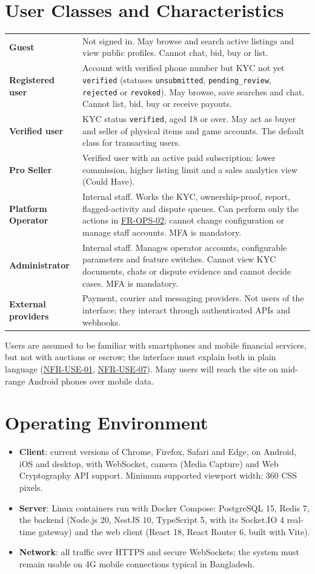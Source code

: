 \documentclass[11pt,a4paper]{report}
\makeatletter
\newcommand{\rr}[1]{\hyperlink{#1}{#1}}
\newenvironment{deftable}{\small\begin{longtable}{@{}>{\raggedright\arraybackslash}p{3.6cm}>{\raggedright\arraybackslash}p{11.3cm}@{}}}{\end{longtable}}
\makeatother
\begin{document}
\section{User Classes and Characteristics}
\label{sec:classes}
\begin{deftable}
\textbf{Guest} & Not signed in. May browse and search active listings and view public profiles. Cannot chat, bid, buy or list. \\
\textbf{Registered user} & Account with verified phone number but KYC not yet \texttt{verified} (statuses \texttt{unsubmitted}, \texttt{pending\_review}, \texttt{rejected} or \texttt{revoked}). May browse, save searches and chat. Cannot list, bid, buy or receive payouts. \\
\textbf{Verified user} & KYC status \texttt{verified}, aged 18 or over. May act as buyer and seller of physical items and game accounts. The default class for transacting users. \\
\textbf{Pro Seller} & Verified user with an active paid subscription: lower commission, higher listing limit and a sales analytics view (Could Have). \\
\textbf{Platform Operator} & Internal staff. Works the KYC, ownership-proof, report, flagged-activity and dispute queues. Can perform only the actions in \rr{FR-OPS-02}; cannot change configuration or manage staff accounts. MFA is mandatory. \\
\textbf{Administrator} & Internal staff. Manages operator accounts, configurable parameters and feature switches. Cannot view KYC documents, chats or dispute evidence and cannot decide cases. MFA is mandatory. \\
\textbf{External providers} & Payment, courier and messaging providers. Not users of the interface; they interact through authenticated APIs and webhooks. \\
\end{deftable}
Users are assumed to be familiar with smartphones and mobile financial services, but not with auctions or escrow; the interface must explain both in plain language (\rr{NFR-USE-01}, \rr{NFR-USE-07}). Many users will reach the site on mid-range Android phones over mobile data.

\section{Operating Environment}
\begin{itemize}[nosep]
    \item \textbf{Client}: current versions of Chrome, Firefox, Safari and Edge, on Android, iOS and desktop, with WebSocket, camera (Media Capture) and Web Cryptography API support. Minimum supported viewport width: 360 CSS pixels.
    \item \textbf{Server}: Linux containers run with Docker Compose: PostgreSQL 15, Redis 7, the backend (Node.js 20, NestJS 10, TypeScript 5, with its Socket.IO 4 real-time gateway) and the web client (React 18, React Router 6, built with Vite).
    \item \textbf{Network}: all traffic over HTTPS and secure WebSockets; the system must remain usable on 4G mobile connections typical in Bangladesh.
\end{itemize}
\end{document}
